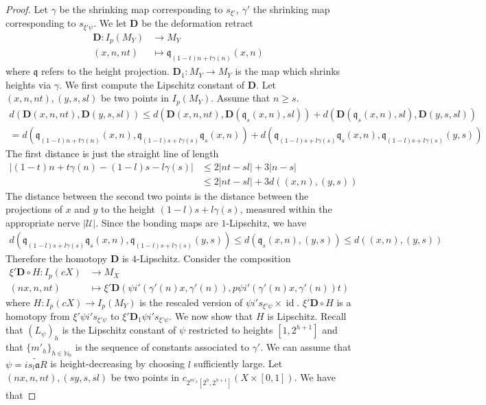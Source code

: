 \documentclass[10pt,a4paper]{amsart}
\DeclareMathOperator{\id}{id}
\begin{document}
\begin{proof}
Let $\gamma$ be the shrinking map corresponding to $s_{\xi'}$, $\gamma'$ the shrinking map corresponding to $s_{\xi' \psi}$. We let $\mathbf{D}$ be the deformation retract
\begin{align*}
\mathbf{D}: I_{p}(M_{Y})&\rightarrow M_{Y}\\
(x,n,nt)&\mapsto \mathfrak{q}_{(1-t)n + t\gamma(n)}(x,n)
\end{align*}
where $\mathfrak{q}$ refers to the height projection. $\mathbf{D}_{1}: M_{Y} \rightarrow M_{Y}$ is the map which shrinks heights via $\gamma$. We first compute the Lipschitz constant of $\mathbf{D}$. Let $(x,n,nt),(y,s,sl)$ be two points in $I_{p}(M_{Y})$. Assume that $n\geq s$. 
\begin{align*}
d(\mathbf{D}(x,n,nt),\mathbf{D}(y,s,sl)) \leq d(\mathbf{D}(x,n,nt),\mathbf{D}(\mathfrak{q}_{s}(x,n),sl)) + d(\mathbf{D}(\mathfrak{q}_{s}(x,n),sl),\mathbf{D}(y,s,sl))\\
=d(\mathfrak{q}_{(1-t)n + t\gamma(n)}(x,n), \mathfrak{q}_{(1-l)s + l\gamma(s)}\mathfrak{q}_{s}(x,n)) +d(\mathfrak{q}_{(1-l)s + l\gamma(s)}\mathfrak{q}_{s}(x,n), \mathfrak{q}_{(1-l)s + l\gamma(s)}(y,s))
\end{align*} 
The first distance is just the straight line of length
\begin{align*}
|(1-t)n +t \gamma(n)-(1-l)s - l\gamma(s)| &\leq 2|nt-sl| + 3|n-s|\\
&\leq 2|nt-sl| + 3d((x,n),(y,s))
\end{align*} 
The distance between the second two points is the distance between the projections of $x$ and $y$ to the height $(1-l)s + l\gamma(s)$, measured within the appropriate nerve $|\mathcal{U}|$. Since the bonding maps are $1$-Lipschitz, we have
\begin{align*}
d(\mathfrak{q}_{(1-l)s + l\gamma(s)}\mathfrak{q}_{s}(x,n), \mathfrak{q}_{(1-l)s + l\gamma(s)}(y,s)) \leq d(\mathfrak{q}_{s}(x,n),(y,s)) \leq d((x,n),(y,s))
\end{align*}
Therefore the homotopy $\mathbf{D}$ is $4$-Lipschitz. Consider the composition 
\begin{align*}
\xi'  \mathbf{D}\circ H: I_{p}(cX)&\rightarrow M_{X}\\
(nx,n,nt)&\mapsto \xi' \mathbf{D}(\psi i'(\gamma'(n) x, \gamma'(n)), p\psi i'(\gamma'(n) x, \gamma'(n)) t)
\end{align*}
where $H: I_{p}(cX)\rightarrow I_{p}(M_{Y})$ is the rescaled version of $\psi i' s_{\xi' \psi}\times \id$. $\xi'  \mathbf{D}\circ H$ is a homotopy from $\xi' \psi i' s_{\xi' \psi}$ to  $\xi' \mathbf{D}_{1} \psi i' s_{\xi' \psi}$. We now show that $H$ is Lipschitz. Recall that $(L_{\psi})_{h}$ is the Lipschitz constant of $\psi$ restricted to heights $[1,2^{h+1}]$ and that $\{m'_{h}\}_{h\in \mathbb{N}_0}$ is the sequence of constants associated to $\gamma'$.  We can assume that $\psi = \widetilde{is_{l}\mathfrak{a}R}$ is height-decreasing by choosing $l$ sufficiently large. Let $(nx,n,nt),(sy,s,sl)$ be two points in $c_{ 2^{m'_{h}}[2^h,2^{h+1}]}(X \times [0,1])$. We have that

\end{proof}
\end{document}

